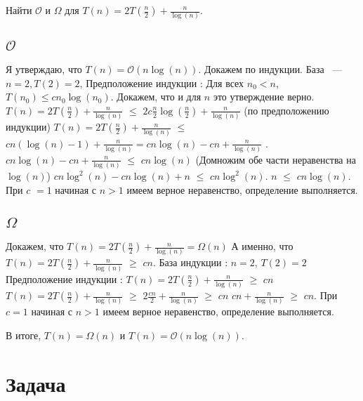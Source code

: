 \documentclass{article}
\begin{document}
Найти $\mathcal{O}$  и  $\Omega$ для $T(n) = 2T(\frac{n}{2}) + \frac{n}{\log(n)}$.
\subsection{$\mathcal{O}$}
Я утверждаю, что $T(n) = \mathcal{O}(n\log(n))$. Докажем по индукции. База ~--- $n = 2, T(2) = 2$, 
\newline
Предположение индукции : Для всех $n_{0} < n$, $T(n_{0}) \leq cn_{0}\log(n_{0})$. Докажем, что и для $n$ это утверждение верно.
\newline
$T(n) = 2T(\frac{n}{2}) + \frac{n}{\log(n)}$ $\leq$ $2c\frac{n}{2}\log(\frac{n}{2}) + \frac{n}{\log(n)}$  (по предположению индукции)
\newline
$T(n) = 2T(\frac{n}{2}) + \frac{n}{\log(n)}$ $\leq$ $cn(\log(n) - 1) + \frac{n}{\log(n)} = cn\log(n) - cn + \frac{n}{\log(n)}$ .
\newline
$cn\log(n) - cn + \frac{n}{\log(n)}$ $\leq$ $cn\log(n)$ (Домножим обе части неравенства на $\log(n)$)
$cn\log^{2}(n) - cn\log(n) + n$ $\leq$ $cn\log^{2}(n)$.
\newline
$n$ $\leq$ $cn\log(n)$. 
При $c$ $= 1$ начиная с $n > 1$ имеем верное неравенство, определение выполняется. %

\subsection{$\Omega$}
Докажем, что $T(n) = 2T(\frac{n}{2}) + \frac{n}{\log(n)} = \Omega(n)$
\newline
А именно, что $T(n) = 2T(\frac{n}{2}) + \frac{n}{\log(n)}$ $\geq$ $cn$.
\newline
База индукции : $n = 2$, $T(2) = 2$ 
\newline
Предположение индукции : $T(n) = 2T(\frac{n}{2}) + \frac{n}{\log(n)}$ $\geq$ $cn$
\newline%
$T(n) = 2T(\frac{n}{2}) + \frac{n}{\log(n)}$ $\geq$ $2\frac{cn}{2} + \frac{n}{\log(n)}$ $\geq$ $cn$
\newline
$cn + \frac{n}{\log(n)}$ $\geq$ $cn$. При $c = 1$ начиная с $n > 1$ имеем верное неравенство, определение выполняется.
\newline

В итоге, $T(n) = \Omega(n)$ и $T(n) = \mathcal{O}(n\log(n))$.

\section{Задача }
\end{document}
